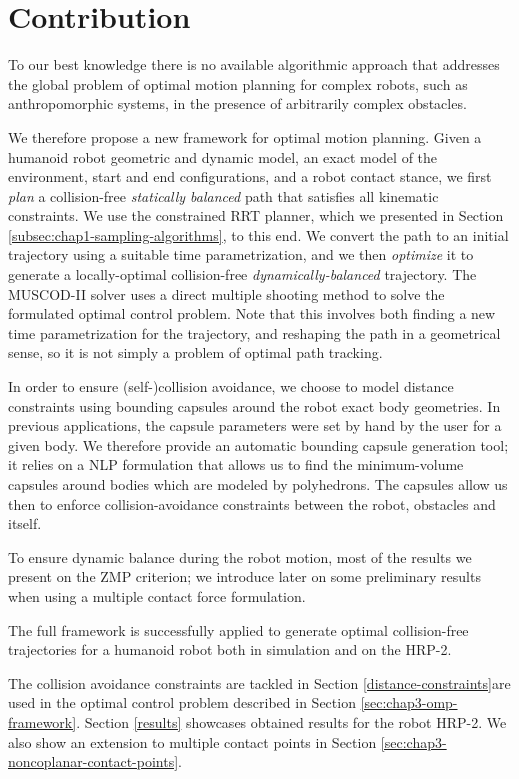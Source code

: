 \section{Contribution}
\label{sec:chap3-contribution}

To our best knowledge there is no available algorithmic approach that
addresses the global problem of optimal motion planning for complex
robots, such as anthropomorphic systems, in the presence of
arbitrarily complex obstacles.

We therefore propose a new framework for optimal motion
planning. Given a humanoid robot geometric and dynamic model, an exact
model of the environment, start and end configurations, and a robot
contact stance, we first \emph{plan} a collision-free \emph{statically
  balanced} path that satisfies all kinematic constraints. We use the
constrained RRT planner, which we presented in Section
\ref{subsec:chap1-sampling-algorithms}, to this end. We convert the
path to an initial trajectory using a suitable time parametrization,
and we then \emph{optimize} it to generate a locally-optimal
collision-free \emph{dynamically-balanced} trajectory. The
\textsc{MUSCOD-II} solver uses a direct multiple shooting method to
solve the formulated optimal control problem. Note that this involves
both finding a new time parametrization for the trajectory, and
reshaping the path in a geometrical sense, so it is not simply a
problem of optimal path tracking.

In order to ensure (self-)collision avoidance, we choose to model
distance constraints using bounding capsules around the robot exact
body geometries. In previous applications, the capsule parameters were
set by hand by the user for a given body. We therefore provide an
automatic bounding capsule generation tool; it relies on a NLP
formulation that allows us to find the minimum-volume capsules around
bodies which are modeled by polyhedrons. The capsules allow us then to
enforce collision-avoidance constraints between the robot, obstacles
and itself.

To ensure dynamic balance during the robot motion, most of the results
we present on the ZMP criterion; we introduce later on some
preliminary results when using a multiple contact force formulation.

The full framework is successfully applied to generate optimal
collision-free trajectories for a humanoid robot both in simulation
and on the HRP-2.

The collision avoidance constraints are tackled in Section
\ref{distance-constraints}are used in the optimal control problem
described in Section \ref{sec:chap3-omp-framework}. Section
\ref{results} showcases obtained results for the robot HRP-2. We also
show an extension to multiple contact points in Section
\ref{sec:chap3-noncoplanar-contact-points}.

